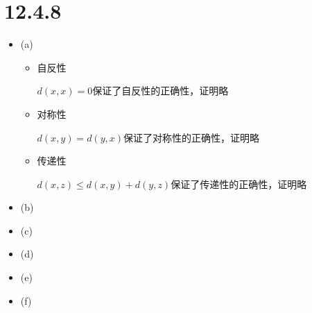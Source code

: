 \documentclass{article}
\begin{document}
\section*{12.4.8}

\begin{itemize}
  \item (a)

        \begin{itemize}
          \item 自反性

                $d(x,x) = 0$保证了自反性的正确性，证明略

          \item 对称性

                $d(x,y) = d(y,x)$保证了对称性的正确性，证明略

          \item 传递性

                $d(x,z) \leq d(x,y) + d(y,z)$保证了传递性的正确性，证明略
        \end{itemize}
  \item (b)


  \item (c)
  \item (d)
  \item (e)
  \item (f)
\end{itemize}
\end{document}
